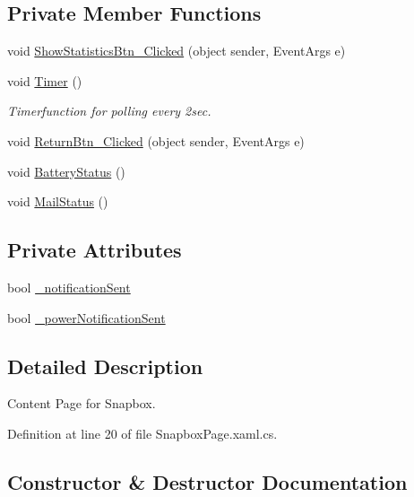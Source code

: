 \subsection*{Private Member Functions}
\begin{DoxyCompactItemize}
\item 
void \mbox{\hyperlink{class_f_w_p_s___app_1_1_snapbox_page_a052ebf6dd10a214b0af721f1120bb73e}{Show\+Statistics\+Btn\+\_\+\+Clicked}} (object sender, Event\+Args e)
\item 
void \mbox{\hyperlink{class_f_w_p_s___app_1_1_snapbox_page_adaab2a50e9ce885bcc53760f312e5b6c}{Timer}} ()
\begin{DoxyCompactList}\small\item\em Timerfunction for polling every 2sec. \end{DoxyCompactList}\item 
void \mbox{\hyperlink{class_f_w_p_s___app_1_1_snapbox_page_a0fe720ce1eeec7b8f6edf83d3294e043}{Return\+Btn\+\_\+\+Clicked}} (object sender, Event\+Args e)
\item 
void \mbox{\hyperlink{class_f_w_p_s___app_1_1_snapbox_page_acd00cef51dc42e06d5a135d333ef1c04}{Battery\+Status}} ()
\item 
void \mbox{\hyperlink{class_f_w_p_s___app_1_1_snapbox_page_a82bcbfe1b24c8bd63222508a4a4f136b}{Mail\+Status}} ()
\end{DoxyCompactItemize}
\subsection*{Private Attributes}
\begin{DoxyCompactItemize}
\item 
bool \mbox{\hyperlink{class_f_w_p_s___app_1_1_snapbox_page_a627ce04dbed30c4dabc8333f99114f06}{\+\_\+notification\+Sent}}
\item 
bool \mbox{\hyperlink{class_f_w_p_s___app_1_1_snapbox_page_abcaad58cdf0a9e1e7e119317faf6e52c}{\+\_\+power\+Notification\+Sent}}
\end{DoxyCompactItemize}


\subsection{Detailed Description}
Content Page for Snapbox. 

Definition at line 20 of file Snapbox\+Page.\+xaml.\+cs.



\subsection{Constructor \& Destructor Documentation}
\mbox{\label{class_f_w_p_s___app_1_1_snapbox_page_a5d949f63be2c1f05f5c9c97f7847608b}} 
